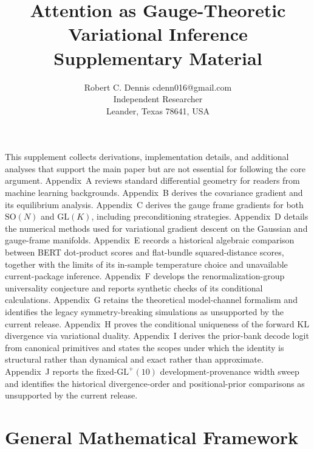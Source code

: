 \documentclass[twoside,11pt]{article}
\begin{document}

\title{Attention as Gauge-Theoretic Variational Inference\\[6pt]
\large Supplementary Material}

\author{\name Robert C. Dennis \email cdenn016@gmail.com \\
  \addr Independent Researcher\\
  \addr Leander, Texas 78641, USA}


\maketitle


This supplement collects derivations, implementation details, and additional analyses that support the main paper but are not essential for following the core argument. Appendix~A reviews standard differential geometry for readers from machine learning backgrounds. Appendix~B derives the covariance gradient and its equilibrium analysis. Appendix~C derives the gauge frame gradients for both $\mathrm{SO}(N)$ and $\mathrm{GL}(K)$, including preconditioning strategies. Appendix~D details the numerical methods used for variational gradient descent on the Gaussian and gauge-frame manifolds. Appendix~E records a historical algebraic comparison between BERT dot-product scores and flat-bundle squared-distance scores, together with the limits of its in-sample temperature choice and unavailable current-package inference. Appendix~F develops the renormalization-group universality conjecture and reports synthetic checks of its conditional calculations. Appendix~G retains the theoretical model-channel formalism and identifies the legacy symmetry-breaking simulations as unsupported by the current release. Appendix~H proves the conditional uniqueness of the forward KL divergence via variational duality. Appendix~I derives the prior-bank decode logit from canonical primitives and states the scopes under which the identity is structural rather than dynamical and exact rather than approximate. Appendix~J reports the fixed-$\mathrm{GL}^+(10)$ development-provenance width sweep and identifies the historical divergence-order and positional-prior comparisons as unsupported by the current release.

\appendix

\section{General Mathematical Framework}
\end{document}
